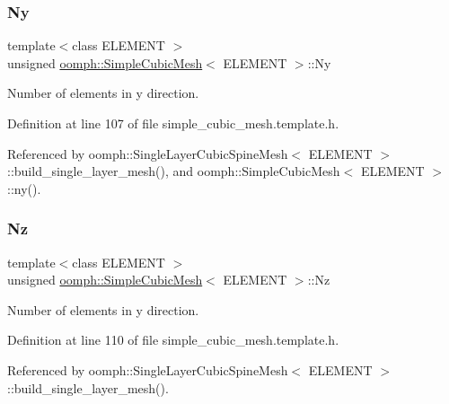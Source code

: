 \subsubsection{\texorpdfstring{Ny}{Ny}}
{\footnotesize\ttfamily template$<$class E\+L\+E\+M\+E\+NT $>$ \\
unsigned \hyperlink{classoomph_1_1SimpleCubicMesh}{oomph\+::\+Simple\+Cubic\+Mesh}$<$ E\+L\+E\+M\+E\+NT $>$\+::Ny\hspace{0.3cm}{\ttfamily [protected]}}



Number of elements in y direction. 



Definition at line 107 of file simple\+\_\+cubic\+\_\+mesh.\+template.\+h.



Referenced by oomph\+::\+Single\+Layer\+Cubic\+Spine\+Mesh$<$ E\+L\+E\+M\+E\+N\+T $>$\+::build\+\_\+single\+\_\+layer\+\_\+mesh(), and oomph\+::\+Simple\+Cubic\+Mesh$<$ E\+L\+E\+M\+E\+N\+T $>$\+::ny().

\mbox{\label{classoomph_1_1SimpleCubicMesh_a370e4597208fa51bca60750ae1e5acd4}} 
\subsubsection{\texorpdfstring{Nz}{Nz}}
{\footnotesize\ttfamily template$<$class E\+L\+E\+M\+E\+NT $>$ \\
unsigned \hyperlink{classoomph_1_1SimpleCubicMesh}{oomph\+::\+Simple\+Cubic\+Mesh}$<$ E\+L\+E\+M\+E\+NT $>$\+::Nz\hspace{0.3cm}{\ttfamily [protected]}}



Number of elements in y direction. 



Definition at line 110 of file simple\+\_\+cubic\+\_\+mesh.\+template.\+h.



Referenced by oomph\+::\+Single\+Layer\+Cubic\+Spine\+Mesh$<$ E\+L\+E\+M\+E\+N\+T $>$\+::build\+\_\+single\+\_\+layer\+\_\+mesh().

\mbox{\label{classoomph_1_1SimpleCubicMesh_afdfcb28e93c910a57b9c6ab116f5fd2f}} 
